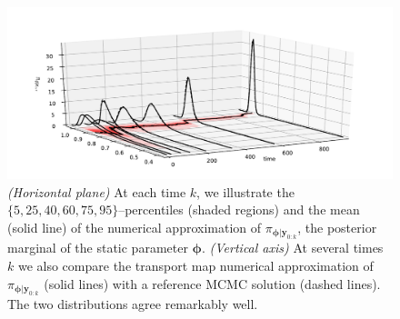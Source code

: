 \documentclass[twoside,11pt]{article}
\newcommand{\yb}{\boldsymbol{y}}
\newcommand{\phib}{\boldsymbol{\phi}}
\begin{document}
%
%
%
%
%
%
%
%
%
%
%
%
%
%
%
%
%

\begin{figure}[H] %
  \begin{center}
        \includegraphics[width=1.0\textwidth, bb=65bp 0bp 650bp 290bp, clip]{filtering-marginals-timesteps_phi-3d.pdf}   
    \caption{\emph{(Horizontal plane)} At each time $k$, we illustrate the
      $\{5,25,40,60,75,95\}$--percentiles (shaded regions) and the mean (solid line) of 
      the numerical approximation of $\pi_{ \phib \vert \yb_{0:k}}$,
      the posterior marginal of
      the static parameter $\phib$. 
      \emph{(Vertical axis)} At several times $k$ %
      we also compare 
      the transport map numerical approximation of 
         $\pi_{ \phib \vert \yb_{0:k}}$ 
          (solid lines)
      with a reference MCMC solution (dashed lines).
      The two distributions agree remarkably well.}
  \label{fig:stoc-vol:3d-phi-vs-unbiased} 
  \end{center}
\end{figure}
\end{document}
